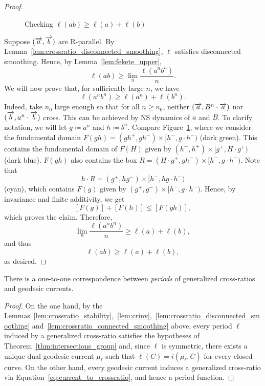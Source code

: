 \begin{proof}


    \begin{figure}[ht!]
     \centering
{}
    \caption{Checking $\ell(ab) \geq \ell(a) + \ell(b)$}\label{fig:c8}
\end{figure} 
Suppose $(\overrightarrow{a},\overrightarrow{b})$ are R-parallel. By Lemma~\ref{lem:crossratio_disconnected_smoothing}, $\ell$ satisfies disconnected smoothing. Hence, by Lemma~\ref{lem:fekete_upper},
\[
\ell(ab) \geq \lim_n \frac{\ell(a^nb^n)}{n}.
\]
We will now prove that, for sufficiently large $n$, we have
\[
\ell(a^nb^n) \geq \ell(a^n) + \ell(b^n).
\]
Indeed, take $n_0$ large enough so that for all $n \geq n_0$, neither $(\overrightarrow{a}, B^n \cdot \overrightarrow{a})$ nor $(\overrightarrow{b}, a^n \cdot \overrightarrow{b})$ cross. 
This can be achieved by NS dynamics of $a$ and $B$. To clarify
notation, we will let $g \coloneqq a^n$ and $h \coloneqq b^n$. Compare
Figure~\ref{fig:c8}, where we consider the fundamental domain $F(gh) =
(gh^+, gh^-) \times [h^-, g\cdot h^-)$ (dark green).
This contains the fundamental domain of $F(H)$ given by $(h^-, h^+) \times [g^+, H \cdot g^+)$ (dark blue). $F(gh)$ also contains the box $R=(H \cdot g^+, gh^-) \times [h^-, g \cdot h^-)$. Note that
\[
h \cdot R = (g^+, hg^-) \times [h^-, hg \cdot h^-)
\]
(cyan), which contains $F(g)$ given by $(g^+, g^-) \times [h^-, g \cdot h^-)$.
Hence, by invariance and finite additivity, we get
\[
[F(g)] + [F(h)] \leq [F(gh)],
\]
which proves the claim.
Therefore, 
\[
\lim_n \frac{\ell(a^nb^n)}{n} \geq \ell(a) + \ell(b),
\]
and thus
\[
\ell(ab) \geq \ell(a) + \ell(b),
\]
as desired.
\end{proof}

\begin{theorem}
There is a one-to-one correspondence between \emph{periods} of generalized cross-ratios and geodesic currents.
\end{theorem}
\begin{proof}
On the one hand, by the Lemmas~\ref{lem:crossratio_stability},~\ref{lem:crinv},~\ref{lem:crossratio_disconnected_smoothing} and~\ref{lem:crossratio_connected_smoothing} above, every period $\ell$ induced by a generalized cross-ratio satisfies the hypotheses of Theorem~\ref{thm:intersections_group} and, since $\ell$ is symmetric, there exists a unique dual geodesic current $\mu_{\ell}$ such that $\ell(C)=i(\mu_{\ell},C)$ for every closed curve. On the other hand, every geodesic current induces a generalized cross-ratio via Equation~\ref{eq:current_to_crossratio}, and hence a period function.
\end{proof}









